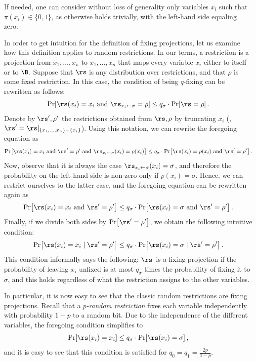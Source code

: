 If needed, one can consider without loss of generality only variables
$x_{i}$ such that $\pi(x_{i})\in\{0,1\}$, as otherwise 
holds trivially, with the left-hand side equaling zero.
\begin{example}
In order to get intuition for the definition of fixing projections,
let us examine how this definition applies to random restrictions.
In our terms, a restriction is a projection from $x_{1},\ldots,x_{n}$
to $x_{1},\ldots,x_{n}$ that maps every variable $x_{i}$ either
to itself or to $\B$. Suppose that $\rs$ is any distribution over
restrictions, and that $\rho$ is some fixed restriction. In this
case, the condition of being $q$-fixing can be rewritten as follows:
\[
\Pr\!\left[\rs(x_{i})=x_{i}\text{ and }\rs_{x_{i}\gets\sigma}=\rho\right]\le q_{\sigma}\cdot\Pr\!\left[\rs=\rho\right].
\]
Denote by $\rs',\rho'$ the restrictions obtained from $\rs,\rho$
by truncating $x_{i}$ (\ie, $\rs'=\rs|_{\left\{ x_{1},\ldots,x_{n}\right\} -\left\{ x_{i}\right\} }$).
Using this notation, we can rewrite the foregoing equation as 
\[
\Pr\!\left[\rs(x_{i})=x_{i}\text{ and }\rs'=\rho'\text{ and }\rs_{x_{i}\gets\sigma}(x_{i})=\rho(x_{i})\right]\le q_{\sigma}\cdot\Pr\!\left[\rs(x_{i})=\rho(x_{i})\text{ and }\rs'=\rho'\right].
\]
Now, observe that it is always the case $\rs_{x_{i}\gets\sigma}(x_{i})=\sigma$,
and therefore the probability on the left-hand side is non-zero only
if $\rho(x_{i})=\sigma$. Hence, we can restrict ourselves to the
latter case, and the foregoing equation can be rewritten again as
\[
\Pr\!\left[\rs(x_{i})=x_{i}\text{ and }\rs'=\rho'\right]\le q_{\sigma}\cdot\Pr\!\left[\rs(x_{i})=\sigma\text{ and }\rs'=\rho'\right].
\]
Finally, if we divide both sides by $\Pr\!\left[\rs'=\rho'\right]$,
we obtain the following intuitive condition: 
\[
\Pr\!\left[\rs(x_{i})=x_{i}\mid\rs'=\rho'\right]\le q_{\sigma}\cdot\Pr\!\left[\rs(x_{i})=\sigma\mid\rs'=\rho'\right].
\]
This condition informally says the following: $\rs$~is a fixing
projection if the probability of leaving $x_{i}$ unfixed is at most
$q_{\sigma}$ times the probability of fixing it to $\sigma$, and
this holds regardless of what the restriction assigns to the other
variables.

In particular, it is now easy to see that the classic random restrictions
are fixing projections. Recall that a $p$\emph{-random restriction}
fixes each variable independently with probability $1-p$ to a random
bit. Due to the independence of the different variables, the foregoing
condition simplifies to 
\[
\Pr\!\left[\rs(x_{i})=x_{i}\right]\le q_{\sigma}\cdot\Pr\!\left[\rs(x_{i})=\sigma\right],
\]
and it is easy to see that this condition is satisfied for $q_{0}=q_{1}=\frac{2p}{1-p}$. 
\end{example}

